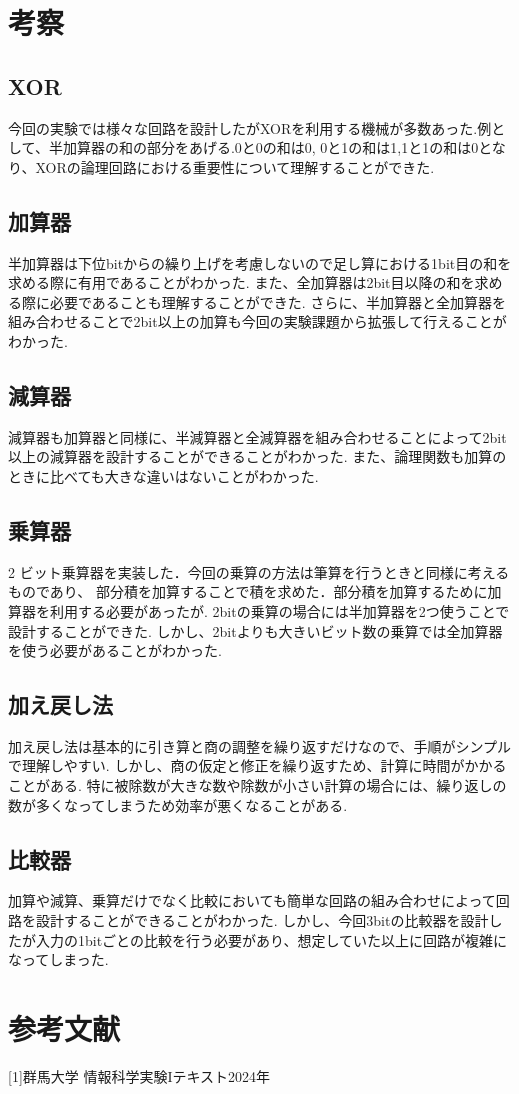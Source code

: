\documentclass[titlepage]{jsarticle}
\theoremstyle{definition}
\begin{document}
\section{考察}

\subsection{XOR}
今回の実験では様々な回路を設計したがXORを利用する機械が多数あった.例として、半加算器の和の部分をあげる.0と0の和は0,
0と1の和は1,1と1の和は0となり、XORの論理回路における重要性について理解することができた.

\subsection{加算器}
半加算器は下位bitからの繰り上げを考慮しないので足し算における1bit目の和を求める際に有用であることがわかった.
また、全加算器は2bit目以降の和を求める際に必要であることも理解することができた.
さらに、半加算器と全加算器を組み合わせることで2bit以上の加算も今回の実験課題から拡張して行えることがわかった.

\subsection{減算器}
減算器も加算器と同様に、半減算器と全減算器を組み合わせることによって2bit以上の減算器を設計することができることがわかった.
また、論理関数も加算のときに比べても大きな違いはないことがわかった.

\subsection{乗算器}
2 ビット乗算器を実装した．今回の乗算の方法は筆算を行うときと同様に考えるものであり、
部分積を加算することで積を求めた．部分積を加算するために加算器を利用する必要があったが.
2bitの乗算の場合には半加算器を2つ使うことで設計することができた.
しかし、2bitよりも大きいビット数の乗算では全加算器を使う必要があることがわかった.

\subsection{加え戻し法}
加え戻し法は基本的に引き算と商の調整を繰り返すだけなので、手順がシンプルで理解しやすい.
しかし、商の仮定と修正を繰り返すため、計算に時間がかかることがある.
特に被除数が大きな数や除数が小さい計算の場合には、繰り返しの数が多くなってしまうため効率が悪くなることがある.


\subsection{比較器}
加算や減算、乗算だけでなく比較においても簡単な回路の組み合わせによって回路を設計することができることがわかった.
しかし、今回3bitの比較器を設計したが入力の1bitごとの比較を行う必要があり、想定していた以上に回路が複雑になってしまった.


\section{参考文献}
[1]群馬大学 情報科学実験Iテキスト2024年
\end{document}
